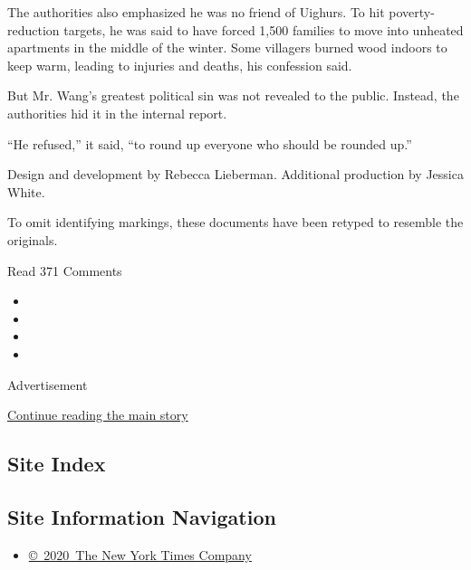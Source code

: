 The authorities also emphasized he was no friend of Uighurs. To hit
poverty-reduction targets, he was said to have forced 1,500 families to
move into unheated apartments in the middle of the winter. Some
villagers burned wood indoors to keep warm, leading to injuries and
deaths, his confession said.

But Mr. Wang's greatest political sin was not revealed to the public.
Instead, the authorities hid it in the internal report.

``He refused,'' it said, ``to round up everyone who should be rounded
up.''

Design and development by Rebecca Lieberman. Additional production by
Jessica White.

To omit identifying markings, these documents have been retyped to
resemble the originals.

Read 371 Comments

\begin{itemize}
\item
\item
\item
\item
\end{itemize}

Advertisement

\protect\hyperlink{after-bottom}{Continue reading the main story}

\hypertarget{site-index}{%
\subsection{Site Index}\label{site-index}}

\hypertarget{site-information-navigation}{%
\subsection{Site Information
Navigation}\label{site-information-navigation}}

\begin{itemize}
\tightlist
\item
  \href{https://help.nytimes.com/hc/en-us/articles/115014792127-Copyright-notice}{©~2020~The
  New York Times Company}
\end{itemize}

